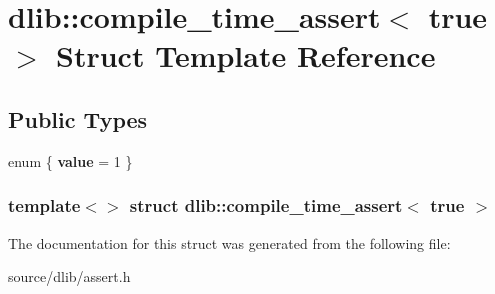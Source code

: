 \hypertarget{structdlib_1_1compile__time__assert_3_01true_01_4}{
\section{dlib::compile\_\-time\_\-assert$<$ true $>$ Struct Template Reference}
\label{structdlib_1_1compile__time__assert_3_01true_01_4}
}
\subsection*{Public Types}
\begin{DoxyCompactItemize}
\item 
enum \{ {\bfseries value} = 1
 \}
\end{DoxyCompactItemize}
\subsubsection*{template$<$$>$ struct dlib::compile\_\-time\_\-assert$<$ true $>$}



The documentation for this struct was generated from the following file:\begin{DoxyCompactItemize}
\item 
source/dlib/assert.h\end{DoxyCompactItemize}
